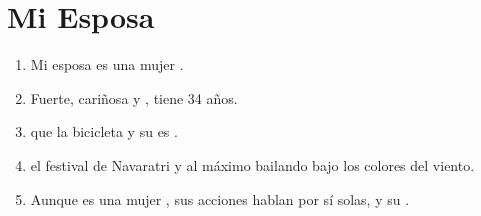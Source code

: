 \documentclass[grid,avery5371]{article}
\begin{document}
\section{Mi Esposa}
\begin{enumerate}
\item Mi esposa es una mujer .
\item Fuerte, cariñosa y , tiene 34 años. 
\item {} que  la bicicleta y su  es . 
\item {} el festival de Navaratri y  al máximo bailando bajo los colores del viento. 
\item Aunque es una mujer , sus acciones hablan por sí solas,  y su .
\end{enumerate}
\end{document}
